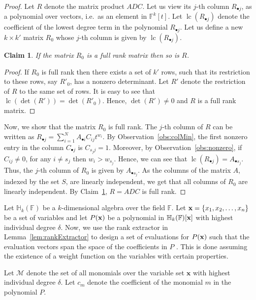 \documentclass[final,oneeqnum, onethmnum, onefignum]{siamltex1213}
\newcommand{\F}{\mathbb F}
\newcommand{\M}{\mathcal M}
\newcommand{\degree}{\delta} %
\DeclareMathOperator{\lc}{lc}
\renewcommand{\H}{\mathbb H}
\newtheorem{claim}[theorem]{Claim}
\begin{document}
{\begin{proof}
Let $R$ denote the matrix product $ADC$. 
Let us view its $j$-th column $R_{\bullet j}$,
as a polynomial over vectors, i.e.\ as an element in $\F^{k}[t]$.
Let $\lc(R_{\bullet j})$ denote the coefficient of the lowest 
degree term in the polynomial $R_{\bullet j}$.
Let us define a new $k \times k'$ matrix $R_0$ whose
$j$-th column is given by $\lc(R_{\bullet j})$.

\begin{claim}
\label{claim:lc}
If the matrix $R_0$ is a full rank matrix then so is $R$. 
\end{claim}
\begin{proof}
If $R_0$ is full rank then there exists a set of $k'$ rows,
such that its restriction to these rows, say $R'_0$, has a nonzero determinant. 
Let $R'$ denote the restriction of $R$ to the same set of rows. 
It is easy to see that $\lc(\det(R')) = \det(R'_0)$. 
Hence, $\det(R') \neq 0$ and $R$ is a full rank matrix. 
\end{proof}

Now, we show that the matrix $R_0$ is full rank.
The $j$-th column of $R$ can be written as
$R_{\bullet j} = \sum_{i=1}^N A_{\bullet i} C_{ij} t^{w_i}$.
By Observation~\ref{obs:colMin}, the first nonzero entry in 
the column $C_{\bullet j}$ is $C_{s_j j} = 1$.
Moreover, by Observation~\ref{obs:nonzero}, if $C_{ij} \neq 0$,
for any $i \neq s_j$ then $w_i > w_{s_j}$.
Hence, we can see that $\lc(R_{\bullet j}) = A_{\bullet s_j}$.
Thus, the $j$-th column of $R_0$ is given by $A_{\bullet s_j}$.
As the columns of the matrix $A$, indexed by the set $S$, are linearly independent,
we get that all columns of $R_0$ are linearly independent. 
By Claim~\ref{claim:lc}, $R = ADC$ is full rank.
\end{proof}

Let $\H_k(\F)$ be a $k$-dimensional algebra over the field $\F$. 
Let ${\bf x} = \{x_1, x_2, \dots, x_n\}$ be a set of variables and
let $P({\bf x})$ be a polynomial in $\H_k(\F)[{\bf x}]$ with highest individual 
degree $\degree$. 
Now, we use the rank extractor in Lemma~\ref{lem:rankExtractor}
to design a
set of evaluations for $P({\bf x})$ such that
the evaluation vectors span the space of the coefficients in $P$ .
This is done assuming the existence of a weight function on the variables 
with certain properties. 

Let $\M$ denote the set of all monomials over the variable set ${\mathbf x}$
with highest individual degree $\degree$.
Let $c_m$ denote the coefficient of the monomial $m$ in the polynomial
$P$.

}
\end{document}
